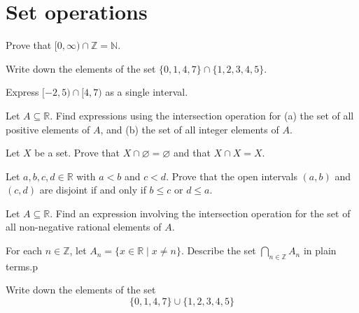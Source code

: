 \section{Set operations}


\begin{exercise}
Prove that $[0,\infty) \cap \mathbb{Z} = \mathbb{N}$.
\end{exercise}

\begin{exercise}
Write down the elements of the set $\{ 0, 1, 4, 7 \} \cap \{ 1, 2, 3, 4, 5 \}$.
\end{exercise}

\begin{exercise}
Express $[-2,5) \cap [4,7)$ as a single interval.
\end{exercise}

\begin{exercise}
Let $A \subseteq \mathbb{R}$. Find expressions using the intersection operation for (a) the set of all positive elements of $A$, and (b) the set of all integer elements of $A$.
\end{exercise}

\begin{exercise}
Let $X$ be a set. Prove that $X \cap \varnothing = \varnothing$ and that $X \cap X = X$.
\end{exercise}


\begin{exercise}
Let $a,b,c,d \in \mathbb{R}$ with $a<b$ and $c<d$. Prove that the open intervals $(a,b)$ and $(c,d)$ are disjoint if and only if $b \le c$ or $d \le a$.
\end{exercise}


\begin{exercise}
Let $A \subseteq \mathbb{R}$. Find an expression involving the intersection operation for the set of all non-negative rational elements of $A$.
\end{exercise}


\begin{exercise}
For each $n \in \mathbb{Z}$, let $A_n = \{ x \in \mathbb{R} \mid x \ne n \}$. Describe the set $\displaystyle \bigcap_{n \in \mathbb{Z}} A_n$ in plain terms.p
\end{exercise}


\begin{exercise}
Write down the elements of the set
\[ \{ 0, 1, 4, 7 \} \cup \{ 1, 2, 3, 4, 5 \} \]
\end{exercise}

